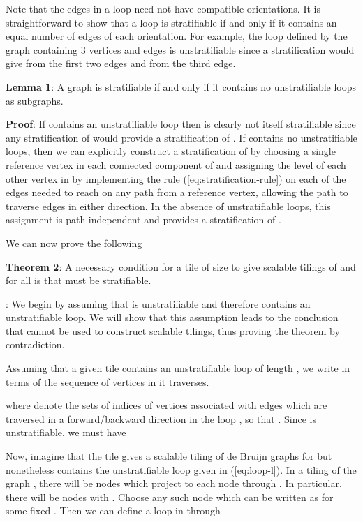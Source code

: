 \documentclass[12pt]{article}
\begin{document}
Note that the edges in a loop need not have compatible orientations.
It is straightforward to show that a loop is stratifiable if and only
if it contains an equal number of edges of each orientation.
For example, the loop defined by the graph containing 3 vertices  and edges  is unstratifiable since a
stratification would give
 from the first two
edges and  from the third edge.


\vspace*{0.1in}
\noindent
{\bf  Lemma 1}: A graph  is stratifiable if and only if it contains
no unstratifiable loops as subgraphs.


\vspace*{0.1in}
\noindent
{\bf Proof}: If  contains an unstratifiable loop  then  is
clearly not itself stratifiable since any stratification of  would
provide a stratification of .  If  contains no unstratifiable
loops, then we can explicitly construct a stratification of  by
choosing a single reference vertex in each connected component of 
and assigning the level of each other vertex  in  by
implementing the rule (\ref{eq:stratification-rule}) on each of the
edges needed to reach  on any path from a reference vertex,
allowing the path to traverse edges in either direction.  In the
absence of unstratifiable loops, this assignment is path independent
and provides a stratification of .
\vspace*{0.1in}

We can now prove the following
\vspace*{0.1in}

\noindent
{\bf Theorem 2}: A necessary condition for a tile  of size 
to give scalable tilings of  and 
for all  is that  must be stratifiable.


\vspace*{0.1in} :
We begin by assuming that  is unstratifiable and therefore
contains an unstratifiable loop.  We will show that this assumption
leads to the conclusion that  cannot be used to construct
scalable tilings, thus proving the theorem by contradiction.

Assuming that a given tile  contains an unstratifiable loop  of
length , we write  in terms of the sequence of vertices in 
it traverses.

where  denote the sets of indices of vertices associated
with edges 
which are traversed in a forward/backward direction in the loop
, so that .
Since  is unstratifiable, we must have


Now, imagine that the tile   gives a scalable
tiling of de Bruijn graphs  for  but nonetheless
contains the unstratifiable loop  given in  (\ref{eq:loop-l}).  In a
tiling of the graph  , there will be  nodes
 which project to each node  through .
In particular, there will be  nodes  with
.  Choose any such node  which
can be written as  for some fixed
.  Then we can define a loop in  through
\end{document}
